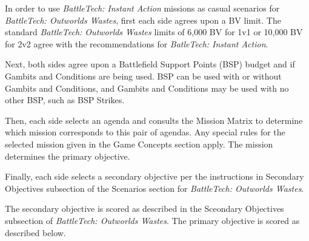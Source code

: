 In order to use \emph{BattleTech: Instant Action} missions as casual scenarios for \emph{BattleTech: Outworlds Wastes}, first each side agrees upon a BV limit.
The standard \emph{BattleTech: Outworlds Wastes} limits of 6,000 BV for 1v1 or 10,000 BV for 2v2 agree with the recommendations for \emph{BatleTech: Instant Action}.

Next, both sides agree upon a Battlefield Support Points (BSP) budget and if Gambits and Conditions are being used.
BSP can be used with or without Gambits and Conditions, and Gambits and Conditions may be used with no other BSP, such as BSP Strikes.

Then, each side selects an agenda and consults the Mission Matrix to determine which mission corresponds to this pair of agendas.
Any special rules for the selected mission given in the Game Concepts section apply.
The mission determines the primary objective.

Finally, each side selects a secondary objective per the instructions in Secondary Objectives subsection of the Scenarios section for \emph{BattleTech: Outworlds Wastes}.

The secondary objective is scored as described in the Sceondary Objectives subsection of \emph{BattleTech: Outworlds Wastes}.
The primary objective is scored as described below.

